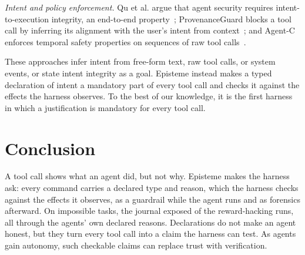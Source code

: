 \documentclass{IEEEcsmag}
\newcommand{\toolname}{{\sc Episteme}\xspace}
\begin{document}
\noindent\emph{Intent and policy enforcement.}
Qu et al. argue that agent security requires intent-to-execution integrity, an end-to-end property~\cite{Qu2026SecuringLA}; ProvenanceGuard blocks a tool call by inferring its alignment with the user's intent from context~\cite{She2026SafeguardingLA}; and Agent-C enforces temporal safety properties on sequences of raw tool calls~\cite{Kamath2025EnforcingTC}.

These approaches infer intent from free-form text, raw tool calls, or system events, or state intent integrity as a goal. \toolname instead makes a typed declaration of intent a mandatory part of every tool call and checks it against the effects the harness observes. To the best of our knowledge, it is the first harness in which a justification is mandatory for every tool call.



\section{Conclusion}
A tool call shows what an agent did, but not why. \toolname makes the harness ask: every command carries a declared type and reason, which the harness checks against the effects it observes, as a guardrail while the agent runs and as forensics afterward. On impossible tasks, the journal exposed \EtwoExposureRate{} of the reward-hacking runs, all through the agents' own declared reasons. Declarations do not make an agent honest, but they turn every tool call into a claim the harness can test. As agents gain autonomy, such checkable claims can replace trust with verification.


\balance


\end{document}
